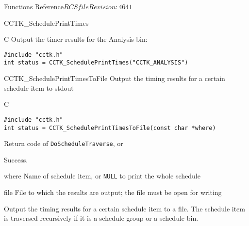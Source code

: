 \begin{cactuspart}{ Functions Reference}{$RCSfile$}{$Revision: 4641 $}
\begin{FunctionDescription}{CCTK\_SchedulePrintTimes}
  \begin{ExampleSection}
    \begin{Example}{C}
      Output the timer results for the Analysis bin:
\begin{verbatim}
#include "cctk.h"
int status = CCTK_SchedulePrintTimes("CCTK_ANALYSIS")
\end{verbatim}
\end{Example}
  \end{ExampleSection}
  
\end{FunctionDescription}



\begin{FunctionDescription}{CCTK\_SchedulePrintTimesToFile}
  \label{CCTK-SchedulePrintTimesToFile}
  Output the timing results for a certain schedule item to stdout
  
  \begin{SynopsisSection}
    \begin{Synopsis}{C}
\begin{verbatim}
#include "cctk.h"
int status = CCTK_SchedulePrintTimesToFile(const char *where)
\end{verbatim}
    \end{Synopsis}
  \end{SynopsisSection}
  
  \begin{ResultSection}
    \begin{ResultNote}
      Return code of \texttt{DoScheduleTraverse}, or
    \end{ResultNote}
    \begin{Result}{0}
      Success.
    \end{Result}
  \end{ResultSection}
  
  \begin{ParameterSection}
    \begin{Parameter}{where}
      Name of schedule item, or \texttt{NULL} to print the whole
      schedule
    \end{Parameter}
    \begin{Parameter}{file}
      File to which the results are output; the file must be open for
      writing
    \end{Parameter}
  \end{ParameterSection}
  
  \begin{Discussion}
    Output the timing results for a certain schedule item to a file.
    The schedule item is traversed recursively if it is a schedule
    group or a schedule bin.
    

\end{Discussion}
\end{FunctionDescription}
\end{cactuspart}
